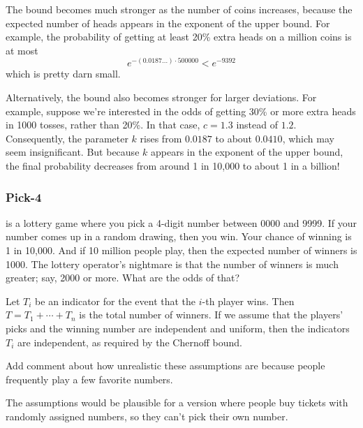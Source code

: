 The bound becomes much stronger as the number of coins increases,
because the expected number of heads appears in the exponent of the
upper bound.  For example, the probability of getting at least 20\%
extra heads on a million coins is at most
\[
e^{- (0.0187\dots) \cdot 500000} < e^{-9392}
\]
which is pretty darn small.

Alternatively, the bound also becomes stronger for larger deviations.
For example, suppose we're interested in the odds of getting 30\% or
more extra heads in 1000 tosses, rather than 20\%.  In that case,
$c= 1.3$ instead of $1.2$.  Consequently, the parameter $k$ rises from
$0.0187$ to about $0.0410$, which may seem insignificant.  But because
$k$ appears in the exponent of the upper bound, the final probability
decreases from around 1 in 10,000 to about 1 in a billion!

\subsubsection{Pick-4}

 is a lottery game where you pick a 4-digit number between 0000
and 9999.  If your number comes up in a random drawing, then you win.
Your chance of winning is 1 in 10,000.  And if 10 million people play,
then the expected number of winners is 1000.  The lottery operator's
nightmare is that the number of winners is much greater; say, 2000 or
more.  What are the odds of that?

Let $T_i$ be an indicator for the event that the $i$-th player wins.
Then $T = T_1 + \cdots + T_n$ is the total number of winners.  If we
assume that the players' picks and the winning number are independent
and uniform, then the indicators $T_i$ are independent, as required by
the Chernoff bound.

\begin{editingnotes}
Add comment about how unrealistic these assumptions are because people
frequently play a few favorite numbers.

The assumptions would be plausible for a version where people buy
tickets with randomly assigned numbers, so they can't pick their own
number.
\end{editingnotes}

